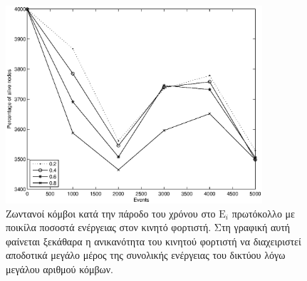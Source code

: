 \begin{figure}[H]
  \centering
   \includegraphics[width=0.85\textwidth]{experiments/4000nodes/3.smallVSbigpercentage/alive_nodes_ei_rc_per_our.eps}
  \caption{Ζωντανοί κόμβοι κατά την πάροδο του χρόνου στο $\text{E}_{i}$ πρωτόκολλο με ποικίλα ποσοστά ενέργειας στον κινητό φορτιστή. Στη γραφική αυτή φαίνεται
ξεκάθαρα η ανικανότητα του κινητού φορτιστή να διαχειριστεί αποδοτικά μεγάλο μέρος της συνολικής ενέργειας του δικτύου λόγω μεγάλου αριθμού κόμβων.}
  \label{fig:5_3exp_1_3}
\end{figure}